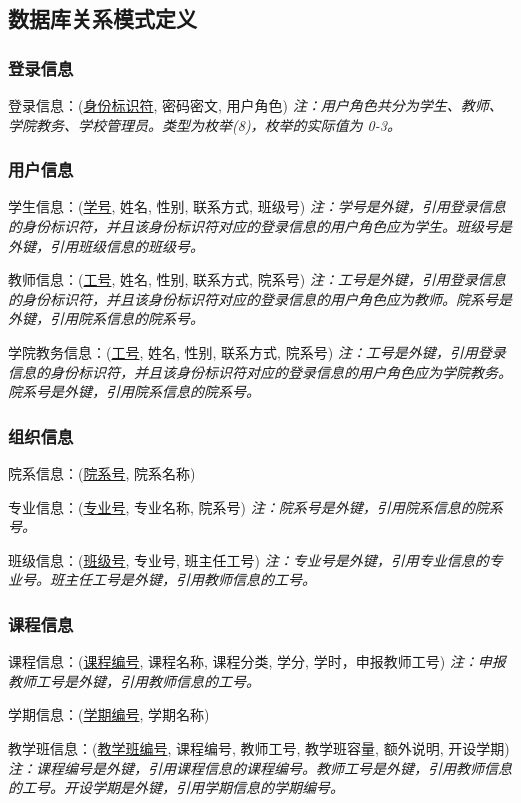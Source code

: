 \subsection{数据库关系模式定义}
\subsubsection{登录信息}
\textsf{登录信息：}(\uline{身份标识符}, 密码密文, 用户角色)
\textsl{注：用户角色共分为学生、教师、学院教务、学校管理员。类型为枚举(8)，枚举的实际值为 0-3。}

\subsubsection{用户信息}
\textsf{学生信息：}(\uline{学号}, 姓名, 性别, 联系方式, 班级号) 
\textsl{注：学号是外键，引用登录信息的身份标识符，并且该身份标识符对应的登录信息的用户角色应为学生。班级号是外键，引用班级信息的班级号。}

\textsf{教师信息：}(\uline{工号}, 姓名, 性别, 联系方式, 院系号)
\textsl{注：工号是外键，引用登录信息的身份标识符，并且该身份标识符对应的登录信息的用户角色应为教师。院系号是外键，引用院系信息的院系号。}

\textsf{学院教务信息：}(\uline{工号}, 姓名, 性别, 联系方式, 院系号)
\textsl{注：工号是外键，引用登录信息的身份标识符，并且该身份标识符对应的登录信息的用户角色应为学院教务。院系号是外键，引用院系信息的院系号。}

\subsubsection{组织信息}
\textsf{院系信息：}(\uline{院系号}, 院系名称)

\textsf{专业信息：}(\uline{专业号}, 专业名称, 院系号)
\textsl{注：院系号是外键，引用院系信息的院系号。}

\textsf{班级信息：}(\uline{班级号}, 专业号, 班主任工号)
\textsl{注：专业号是外键，引用专业信息的专业号。班主任工号是外键，引用教师信息的工号。}

\subsubsection{课程信息}
\textsf{课程信息：}(\uline{课程编号}, 课程名称, 课程分类, 学分, 学时，申报教师工号)
\textsl{注：申报教师工号是外键，引用教师信息的工号。}

\textsf{学期信息：}(\uline{学期编号}, 学期名称)

\textsf{教学班信息：}(\uline{教学班编号}, 课程编号, 教师工号, 教学班容量, 额外说明, 开设学期)
\textsl{注：课程编号是外键，引用课程信息的课程编号。教师工号是外键，引用教师信息的工号。开设学期是外键，引用学期信息的学期编号。}

